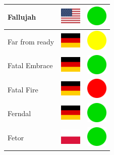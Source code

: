 \documentclass[12pt, a4paper, twoside]{report}
\begin{document}
\begin{center}
\begin{longtable}{|p{5cm}|p{2cm}|p{2cm}|}
 Fallujah                                                   & \includegraphics[width=1cm]{../img/flags/us} &   \includegraphics[width=1cm]{../likes/y} \\ \hline
 Far from ready                                             & \includegraphics[width=1cm]{../img/flags/de} &   \includegraphics[width=1cm]{../likes/m} \\ \hline
 Fatal Embrace                                              & \includegraphics[width=1cm]{../img/flags/de} &   \includegraphics[width=1cm]{../likes/y} \\ \hline
 Fatal Fire                                                 & \includegraphics[width=1cm]{../img/flags/de} &   \includegraphics[width=1cm]{../likes/n} \\ \hline
 Ferndal                                                    & \includegraphics[width=1cm]{../img/flags/de} &   \includegraphics[width=1cm]{../likes/y} \\ \hline
 Fetor                                                      & \includegraphics[width=1cm]{../img/flags/pl} &   \includegraphics[width=1cm]{../likes/y} \\ \hline

\end{longtable}
\end{center}
\end{document}
